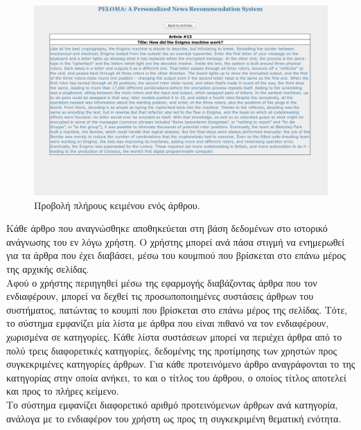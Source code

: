\begin{figure}[!ht] \centering
\centerline{
    \includegraphics[scale=0.4]{static/figures/peloma/article.png}}
    \caption{Προβολή πλήρους κειμένου ενός άρθρου.}
    \label{}
\end{figure} 

\newpage

Κάθε άρθρο που αναγνώσθηκε αποθηκεύεται στη βάση δεδομένων στο ιστορικό ανάγνωσης 
του εν λόγω χρήστη. Ο χρήστης μπορεί ανά πάσα στιγμή να ενημερωθεί για τα άρθρα που έχει διαβάσει, 
μέσω του κουμπιού \textit{{}} που βρίσκεται στο επάνω μέρος της αρχικής σελίδας. \\

Αφού ο χρήστης περιηγηθεί μέσω της εφαρμογής διαβάζοντας άρθρα που τον ενδιαφέρουν, 
μπορεί να δεχθεί τις προσωποποιημένες συστάσεις άρθρων του συστήματος, 
πατώντας το κουμπί \textit{{}} που βρίσκεται στο επάνω μέρος της σελίδας. 
Τότε, το σύστημα εμφανίζει μία λίστα με άρθρα που είναι πιθανό να τον ενδιαφέρουν, χωρισμένα σε κατηγορίες. 
Κάθε λίστα συστάσεων μπορεί να περιέχει άρθρα από το πολύ τρεις διαφορετικές κατηγορίες, 
δεδομένης της προτίμησης των χρηστών προς συγκεκριμένες κατηγορίες άρθρων. 
Για κάθε προτεινόμενο άρθρο αναγράφονται το {} της κατηγορίας στην οποία ανήκει, 
το {} και ο τίτλος του άρθρου, ο οποίος τίτλος αποτελεί και {} προς το πλήρες κείμενο. \\
Το σύστημα εμφανίζει διαφορετικό αριθμό προτεινόμενων άρθρων ανά κατηγορία, 
ανάλογα με το ενδιαφέρον του χρήστη ως προς τη συγκεκριμένη θεματική ενότητα. \\


